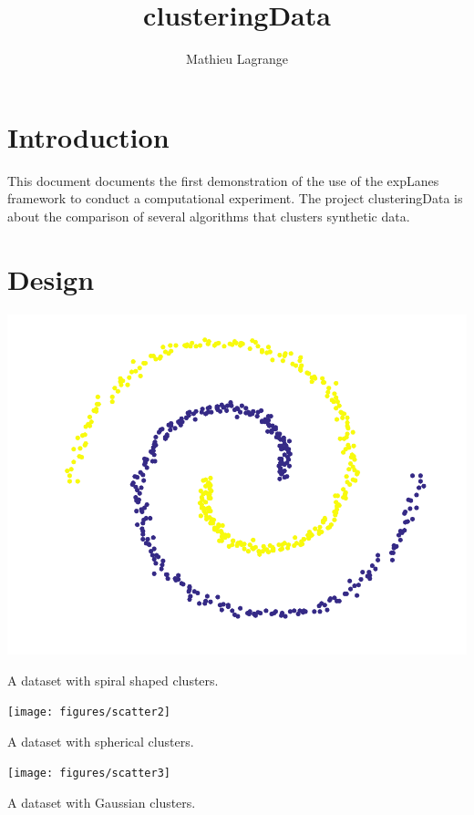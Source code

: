 \documentclass[12pt,a4paper,fleqn]{tufte-handout}
\title[clustering]{clusteringData}
\author{ Mathieu Lagrange }
\begin{document}
 
  
\maketitle 
  
\section{Introduction}


This document documents the first demonstration of the use of the expLanes framework to conduct a computational experiment. The project clusteringData is about the comparison of several algorithms that clusters synthetic data.

\section{Design}

\begin{marginfigure}
\includegraphics[width=\textwidth]{figures/scatter1}
\caption{A dataset with spiral shaped clusters.}
\label{scatter}
\end{marginfigure}

\begin{marginfigure}
\texttt{[image: figures/scatter2]}
\caption{A dataset with spherical clusters.}
\label{scatter}
\end{marginfigure}

\begin{marginfigure}
\texttt{[image: figures/scatter3]}
\caption{A dataset with Gaussian clusters.}
\label{scatter}
\end{marginfigure}
\end{document}
